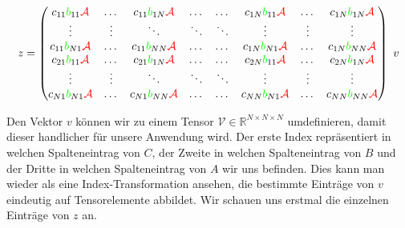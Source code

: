 \begin{equation} \label{eq:matrix} z=
\begin{pmatrix}
c_{11} \textcolor{green}{b}_{11} \textcolor{red}{\mathcal{A}} & \dots  & c_{11} \textcolor{green}{b}_{1N} \textcolor{red}{\mathcal{A}} & \dots & \dots & c_{1N}\textcolor{green}{b}_{11}\textcolor{red}{\mathcal{A}} & \dots & c_{1N}\textcolor{green}{b}_{1N}\textcolor{red}{\mathcal{A}}  \\

\vdots & \vdots & \ddots & \ddots  & \ddots & \vdots & \vdots & \vdots \\
c_{11} \textcolor{green}{b}_{N 1} \textcolor{red}{\mathcal{A}} & \dots  & c_{11} \textcolor{green}{b}_{N N} \textcolor{red}{\mathcal{A}} & \dots & \dots & c_{1 N}\textcolor{green}{b}_{N 1}\textcolor{red}{\mathcal{A}} & \dots & c_{1 N}\textcolor{green}{b}_{N N}\textcolor{red}{\mathcal{A}}  \\
c_{21} \textcolor{green}{b}_{11} \textcolor{red}{\mathcal{A}} & \dots  & c_{21} \textcolor{green}{b}_{1N} \textcolor{red}{\mathcal{A}} & \dots & \dots & c_{2N}\textcolor{green}{b}_{11}\textcolor{red}{\mathcal{A}} & \dots & c_{2 N}\textcolor{green}{b}_{1 N}\textcolor{red}{\mathcal{A}}  \\
\vdots & \vdots & \ddots & \ddots  & \ddots & \vdots & \vdots & \vdots \\
c_{N 1} \textcolor{green}{b}_{N 1} \textcolor{red}{\mathcal{A}} & \dots  & c_{N 1} \textcolor{green}{b}_{N N} \textcolor{red}{\mathcal{A}} & \dots & \dots & c_{N N}\textcolor{green}{b}_{N 1}\textcolor{red}{\mathcal{A}} & \dots & c_{N N}\textcolor{green}{b}_{N N}\textcolor{red}{\mathcal{A}}  \\
\end{pmatrix} \, \, v
\end{equation}

Den Vektor $v$ können wir zu einem Tensor $\mathcal{V} \in \mathbb{R}^{N \times N \times N} $ umdefinieren, damit dieser handlicher für unsere Anwendung wird. Der erste Index repräsentiert in welchen Spalteneintrag von $C$, der Zweite in welchen Spalteneintrag von $B$ und der Dritte in welchen Spalteneintrag von $A$ wir uns befinden. Dies kann man wieder als eine Index-Transformation ansehen, die bestimmte Einträge von $v$ eindeutig auf Tensorelemente abbildet. 
Wir schauen uns erstmal die einzelnen Einträge von $z$ an. 

